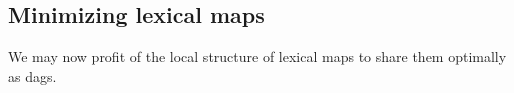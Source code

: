 \subsection{Minimizing lexical maps}

We may now profit of the local structure of lexical maps to share them
optimally as dags.

